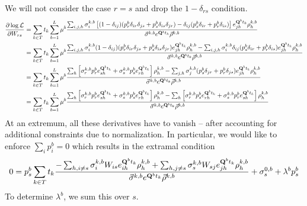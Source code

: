 \documentclass[aps,rmp, onecolumn]{revtex4}
\newcommand{\mat}[1]{{\bf #1}}
\newcommand{\eqp}{p}
\newcommand{\LH}{\mathcal{L}}
\begin{document}
We will not consider the case $r=s$ and drop the $1-\delta_{rs}$ condition.
\begin{equation}
\begin{split}
	\frac{\partial \log \LH}{\partial W_{rs}} & = \sum_{k\in T} t_k \sum_{b=1}^L \mu^b \frac{\sum_{i,j,h}\sigma^{k,b}_i \left[(1-\delta_{ij})(p^b_r\delta_{ir}\delta_{js} + p^b_s\delta_{is}\delta_{jr}) - \delta_{ij}(p^b_s \delta_{ir} + p^b_r\delta_{is})\right] e^{\mat{Q}^{b}t_k}_{jh} \rho^{k,b}_h}{\vec{\sigma}^{k,b} e^{\mat{Q}^{b}t_k} \vec{\rho}^{k,b}} \\
	&= \sum_{k\in T} t_k \sum_{b=1}^L \mu^b \frac{\sum_{i,j,h}\sigma^{k,b}_i (1-\delta_{ij})(p^b_r\delta_{ir}\delta_{js} + p^b_s\delta_{is}\delta_{jr}) e^{\mat{Q}^{b}t_k}_{jh} \rho^{k,b}_h
	- \sum_{i,j,h}\sigma^{k,b}_i\delta_{ij}(p^b_s \delta_{ir} + p^b_r\delta_{is})e^{\mat{Q}^{b}t_k}_{jh} \rho^{k,b}_h}{\vec{\sigma}^{k,b} e^{\mat{Q}^{b}t_k} \vec{\rho}^{k,b}}\\
	&= \sum_{k\in T} t_k \sum_{b=1}^L \mu^b \frac{\sum_{h}\left[\sigma^{k,b}_r p^b_r e^{\mat{Q}^{b}t_k}_{sh} + \sigma^{k,b}_s p^b_s e^{\mat{Q}^{b}t_k}_{rh}\right] \rho^{k,b}_h
	- \sum_{j,h}\sigma^{k,b}_j(p^b_s \delta_{jr} + p^b_r\delta_{js})e^{\mat{Q}^{b}t_k}_{jh} \rho^{k,b}_h}{\vec{\sigma}^{k,b} e^{\mat{Q}^{b}t_k} \vec{\rho}^{k,b}}\\
	&= \sum_{k\in T} t_k \sum_{b=1}^L \mu^b \frac{\sum_{h}\left[\sigma^{k,b}_r p^b_r e^{\mat{Q}^{b}t_k}_{sh} + \sigma^{k,b}_s p^b_s e^{\mat{Q}^{b}t_k}_{rh}\right] \rho^{k,b}_h
	- \sum_{h} \left[\sigma^{k,b}_r p^b_s e^{\mat{Q}^{b}t_k}_{rh} + \sigma^{k,b}_s p^b_r e^{\mat{Q}^{b}t_k}_{sh}\right] \rho^{k,b}_h}{\vec{\sigma}^{k,b} e^{\mat{Q}^{b}t_k} \vec{\rho}^{k,b}}
\end{split}
\end{equation}
At an extremum, all these derivatives have to vanish -- after accounting for additional constraints due to normalization.
In particular, we would like to enforce $\sum_i \eqp^b_i=0$ which results in the extramal condition
\begin{equation}
	0 = \eqp^b_s \sum_{k\in T} t_k \frac{-\sum_{h,i\neq s}\sigma^{k,b}_i W_{is}e^{\mat{Q}^{b}t_k}_{ih} \rho^{k,b}_h + \sum_{h,j\neq s}\sigma^{k,b}_s W_{sj} e^{\mat{Q}^{b}t_k}_{jh} \rho^{k,b}_h}{\vec{\sigma}^{k,b} e^{\mat{Q}^{b}t_k} \vec{\rho}^{k,b}} + \sigma^{0,b}_s + \lambda^b \eqp^b_s
\end{equation}
To determine $\lambda^b$, we sum this over $s$.
\end{document}
